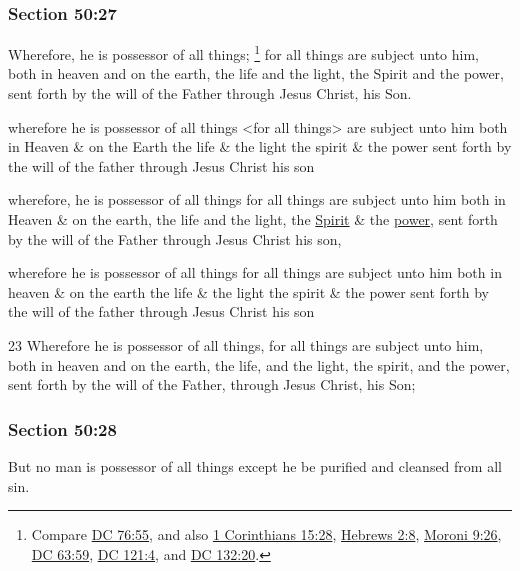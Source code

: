 	\subsubsection{Section 50:27} %
		\label{DC50-27}

		Wherefore, he is possessor of all things;%
			\footnote{%
				Compare \hyperref[DC76-55]{DC 76:55}, and also \hyperref[1CORINTHIANS-15-28]{1 Corinthians 15:28}, \hyperref[HEBREWS-2-8]{Hebrews 2:8}, \hyperref[MORONI-9-26]{Moroni 9:26}, \hyperref[DC63-59]{DC 63:59}, \hyperref[DC121-4]{DC 121:4}, and \hyperref[DC132-20]{DC 132:20}.
				}
		for all things are subject unto him, both in heaven and on the earth, the life and the light, the Spirit and the power, sent forth by the will of the Father through Jesus Christ, his Son.

		\begin{framed}
		\scriptsize
			\begin{compactdesc}
				\item[JSP] wherefore he is possessor of all things <for all things> are subject unto him both in Heaven \& on the Earth the life \& the light the spirit \& the power sent forth by the will of the father through Jesus Christ his son
				\item[Gilbert] wherefore, he is possessor of all things for all things are subject unto him both in Heaven \& on the earth, the life and the light, the \uline{Spirit} \& the \uline{power}, sent forth by the will of the Father through Jesus Christ his son,
				\item[Hyde and Smith] wherefore he is possessor of all things for all things are subject unto him both in heaven \& on the earth the life \& the light the spirit \& the power sent forth by the will of the father through Jesus Christ his son
				\item[BC] 23 Wherefore he is possessor of all things, for all things are subject unto him, both in heaven and on the earth, the life, and the light, the spirit, and the power, sent forth by the will of the Father, through Jesus Christ, his Son;
			\end{compactdesc}
		\end{framed}

	\subsubsection{Section 50:28} %
		\label{DC50-28}

		But no man is possessor of all things except he be purified and cleansed from all sin.

